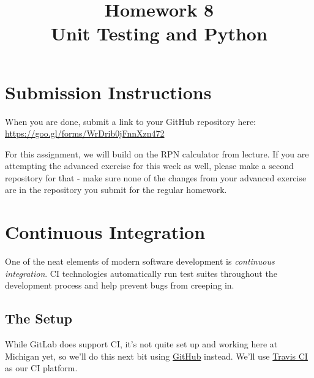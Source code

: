 \documentclass{article}
\begin{document}
\fancyhead[C]{}
\fancyhead[L]{}
\fancyhead[R]{}

\fancyfoot[C]{\color{gray} \thepage~/~\pageref*{LastPage}}
\pagestyle{fancyplain}


\title{\textbf{Homework 8\\Unit Testing and Python}}
\author{\textbf{\color{red}{Due: Wednesday, November 7th, 11:59PM (Hard Deadline)}}}
\date{}
\maketitle

\section*{Submission Instructions}
When you are done, submit a link to your GitHub repository here: \url{https://goo.gl/forms/WrDrib0jFnnXzn472}

\bigskip

\begin{mdframed}\centering
For this assignment, we will build on the RPN calculator from lecture. If you are attempting the advanced exercise for this week as well, please make a second repository for that - make sure none of the changes from your advanced exercise are in the repository you submit for the regular homework.
\end{mdframed}



\section{Continuous Integration}
One of the neat elements of modern software development is \emph{continuous
  integration}. CI technologies automatically run test suites throughout the
development process and help prevent bugs from creeping in.

\subsection{The Setup}

While GitLab does support CI, it's not quite set up and working here at
Michigan yet, so we'll do this next bit using
\href{https://github.com}{GitHub} instead.
We'll use \href{https://travis-ci.org/}{Travis CI} as our CI platform.
\end{document}
